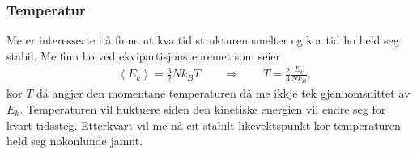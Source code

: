 \documentclass[12pt, a4paper]{article}
\theoremstyle{definition} \newtheorem*{definition}{Teorem}
\begin{document}
        \subsubsection*{Temperatur}
            Me er interesserte i å finne ut kva tid strukturen smelter og kor tid ho held seg stabil. Me finn ho 
            ved ekvipartisjonsteoremet som seier
            \begin{align*}
                &\left \langle E_{k} \right \rangle = \frac{3}{2} Nk_{B}T \qquad \Rightarrow \qquad T = \frac{2}{3}\frac{E_{k}}{Nk_{B}},
            \end{align*}
            kor $T$ då angjer den momentane temperaturen då me ikkje tek gjennomsnittet av $E_{k}$. Temperaturen vil fluktuere siden den kinetiske energien vil endre seg for
            kvart tidssteg. Etterkvart vil me nå eit stabilt likevektspunkt kor temperaturen held seg nokonlunde jamnt.
\end{document}
